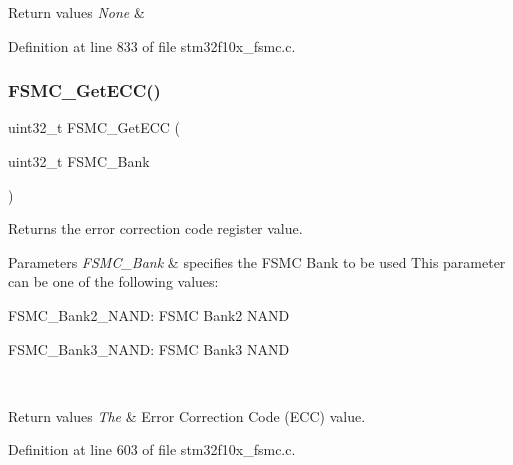 \begin{DoxyRetVals}{Return values}
{\em None} & \\
\hline
\end{DoxyRetVals}


Definition at line 833 of file stm32f10x\+\_\+fsmc.\+c.

\mbox{\label{group___f_s_m_c___private___functions_gaad6d4f5b5a41684ce053fea55bdb98d8}} 
\subsubsection{\texorpdfstring{F\+S\+M\+C\+\_\+\+Get\+E\+C\+C()}{FSMC\_GetECC()}}
{\footnotesize\ttfamily uint32\+\_\+t F\+S\+M\+C\+\_\+\+Get\+E\+CC (\begin{DoxyParamCaption}\item[{uint32\+\_\+t}]{F\+S\+M\+C\+\_\+\+Bank }\end{DoxyParamCaption})}



Returns the error correction code register value. 


\begin{DoxyParams}{Parameters}
{\em F\+S\+M\+C\+\_\+\+Bank} & specifies the F\+S\+MC Bank to be used This parameter can be one of the following values\+: \begin{DoxyItemize}
\item F\+S\+M\+C\+\_\+\+Bank2\+\_\+\+N\+A\+ND\+: F\+S\+MC Bank2 N\+A\+ND \item F\+S\+M\+C\+\_\+\+Bank3\+\_\+\+N\+A\+ND\+: F\+S\+MC Bank3 N\+A\+ND \end{DoxyItemize}
\\
\hline
\end{DoxyParams}

\begin{DoxyRetVals}{Return values}
{\em The} & Error Correction Code (E\+CC) value. \\
\hline
\end{DoxyRetVals}


Definition at line 603 of file stm32f10x\+\_\+fsmc.\+c.

\mbox{\label{group___f_s_m_c___private___functions_gae00355115b078f483f0771057bb849c4}} 
